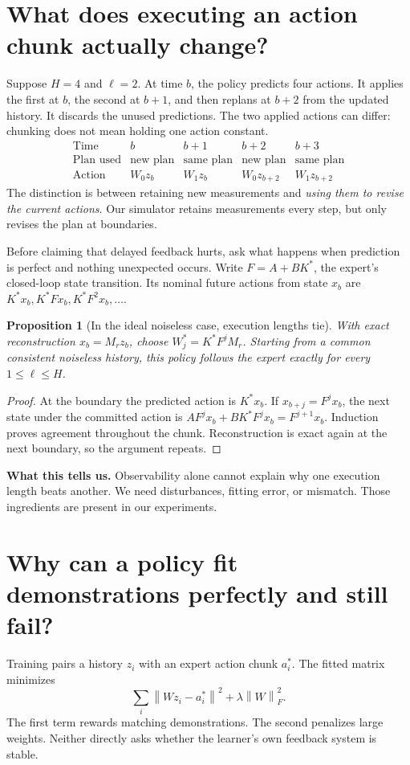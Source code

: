 \documentclass[12 pt]{article}        	%
\newtheorem{proposition}[theorem]{Proposition}
\theoremstyle{definition}
\newcommand{\norm}[1]{\left\|#1\right\|}
\begin{document}
\section{What does executing an action chunk actually change?}
Suppose $H=4$ and $\ell=2$. At time $b$, the policy predicts four actions. It applies the first at $b$, the second at $b+1$, and then replans at $b+2$ from the updated history. It discards the unused predictions. The two applied actions can differ: chunking does not mean holding one action constant.
\[
\begin{array}{c|cccc}
\text{Time}&b&b+1&b+2&b+3\\\hline
\text{Plan used}&\text{new plan}&\text{same plan}&\text{new plan}&\text{same plan}\\
\text{Action}&W_0z_b&W_1z_b&W_0z_{b+2}&W_1z_{b+2}
\end{array}
\]
The distinction is between retaining new measurements and \emph{using them to revise the current actions}. Our simulator retains measurements every step, but only revises the plan at boundaries.

Before claiming that delayed feedback hurts, ask what happens when prediction is perfect and nothing unexpected occurs. Write $F=A+BK^*$, the expert's closed-loop state transition. Its nominal future actions from state $x_b$ are $K^*x_b,K^*Fx_b,K^*F^2x_b,\ldots$.

\begin{proposition}[In the ideal noiseless case, execution lengths tie]\label{prop:ideal}
With exact reconstruction $x_b=M_rz_b$, choose $W_j^*=K^*F^jM_r$. Starting from a common consistent noiseless history, this policy follows the expert exactly for every $1\le\ell\le H$.
\end{proposition}
\begin{proof}
At the boundary the predicted action is $K^*x_b$. If $x_{b+j}=F^jx_b$, the next state under the committed action is
$AF^jx_b+BK^*F^jx_b=F^{j+1}x_b$.
Induction proves agreement throughout the chunk. Reconstruction is exact again at the next boundary, so the argument repeats.
\end{proof}

\textbf{What this tells us.} Observability alone cannot explain why one execution length beats another. We need disturbances, fitting error, or mismatch. Those ingredients are present in our experiments.

\section{Why can a policy fit demonstrations perfectly and still fail?}
Training pairs a history $z_i$ with an expert action chunk $a_i^*$. The fitted matrix minimizes
\[
\sum_i\norm{Wz_i-a_i^*}^2+\lambda\norm{W}_F^2.
\]
The first term rewards matching demonstrations. The second penalizes large weights. Neither directly asks whether the learner's own feedback system is stable.
\end{document}
